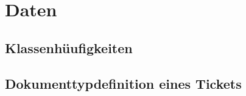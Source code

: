 \chapter{Daten}

\section{Klassenhüufigkeiten}


\section{Dokumenttypdefinition eines Tickets}
\lstset{language=XML}



